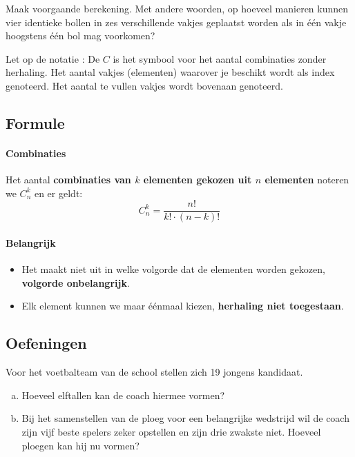 \documentclass[12pt,twoside]{article}
\begin{document}
\begin{theorie}
Maak voorgaande berekening. Met andere woorden, op hoeveel manieren kunnen vier identieke bollen in zes verschillende vakjes geplaatst worden als in één vakje hoogstens één bol mag voorkomen?

Let op de notatie : De $C$ is het symbool voor het aantal combinaties zonder
herhaling. Het aantal vakjes (elementen) waarover je beschikt wordt als index
genoteerd. Het aantal te vullen vakjes wordt bovenaan genoteerd.

\subsection{Formule}

\paragraph*{Combinaties}
\begin{mdframed}
Het aantal {\bf combinaties van $k$ elementen gekozen uit $n$ elementen} noteren we $C^k_n$ en er geldt:
$$C^k_n=\dfrac{n!}{k!\cdot(n-k)!}$$
\end{mdframed}

\paragraph*{Belangrijk}
\begin{itemize}
  \item Het maakt niet uit in welke volgorde dat de elementen worden gekozen, {\bf volgorde onbelangrijk}.
  \item Elk element kunnen we maar éénmaal kiezen, {\bf herhaling niet toegestaan}.
\end{itemize}

\subsection{Oefeningen}

\end{theorie}

\begin{oefening}
Voor het voetbalteam van de school stellen zich 19 jongens kandidaat.
\begin{enumerate}[(a)]
  \item Hoeveel elftallen kan de coach hiermee vormen?
  \item Bij het samenstellen van de ploeg voor een belangrijke wedstrijd wil de coach zijn vijf beste spelers zeker opstellen en zijn drie zwakste niet. Hoeveel ploegen kan hij nu vormen?
\end{enumerate}
\end{oefening}
\end{document}
